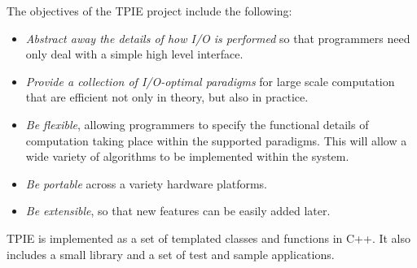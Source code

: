 

The objectives of the TPIE
project include the following:

\begin{itemize}
    \item {\em Abstract away the details of how I/O is
       performed} so that programmers need only deal with a
    simple high level interface.
    \item {\em Provide a collection of I/O-optimal
       paradigms} for large scale computation that are
    efficient not only in theory, but also in practice.
    \item {\em Be flexible}, allowing programmers to specify
    the functional details of computation taking place
    within the supported paradigms.  This will allow a wide
    variety of algorithms to be implemented within the
    system.
    \item {\em Be portable} across a variety hardware
    platforms.
    \item {\em Be extensible}, so that new features can be
    easily added later.
\end{itemize}

TPIE is implemented as a set of templated classes and
functions in C++. It also includes a small
library and a set of test and sample applications.

